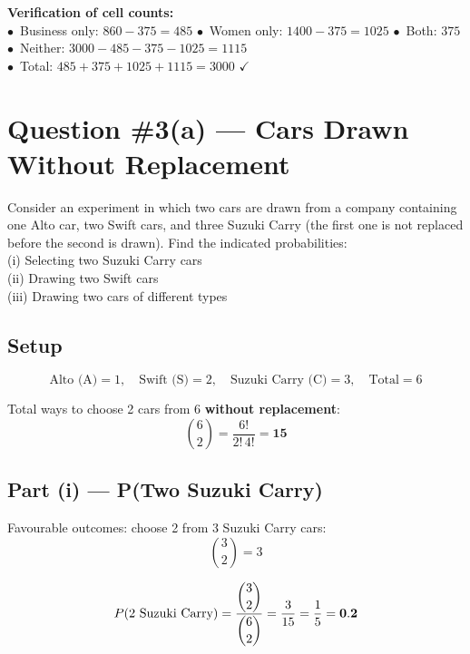 \documentclass[12pt]{article}
\begin{document}
\begin{observebox}
\textbf{Verification of cell counts:}\\[4pt]
$\bullet$\ Business only: $860 - 375 = 485$ \quad
$\bullet$\ Women only: $1400 - 375 = 1025$ \quad
$\bullet$\ Both: $375$\\
$\bullet$\ Neither: $3000 - 485 - 375 - 1025 = 1115$\\
$\bullet$\ Total: $485 + 375 + 1025 + 1115 = 3000$ \quad $\checkmark$
\end{observebox}

\newpage

\section{Question \#3(a) --- Cars Drawn Without Replacement}

\begin{problembox}
Consider an experiment in which two cars are drawn from a company containing one Alto car, two Swift cars, and three Suzuki Carry (the first one is not replaced before the second is drawn). Find the indicated probabilities:\\
(i)   Selecting two Suzuki Carry cars\\
(ii)  Drawing two Swift cars\\
(iii) Drawing two cars of different types
\end{problembox}

\subsection*{Setup}

\[
  \text{Alto (A)} = 1, \quad \text{Swift (S)} = 2, \quad \text{Suzuki Carry (C)} = 3, \quad \text{Total} = 6
\]

Total ways to choose 2 cars from 6 \textbf{without replacement}:
\[
  \binom{6}{2} = \frac{6!}{2!\,4!} = \mathbf{15}
\]

\subsection*{Part (i) --- P(Two Suzuki Carry)}

Favourable outcomes: choose 2 from 3 Suzuki Carry cars:
\[
  \binom{3}{2} = 3
\]

\begin{answerbox}
\[
  P(\text{2 Suzuki Carry}) = \frac{\dbinom{3}{2}}{\dbinom{6}{2}} = \frac{3}{15} = \frac{1}{5} = \mathbf{0.2}
\]
\end{answerbox}
\end{document}
